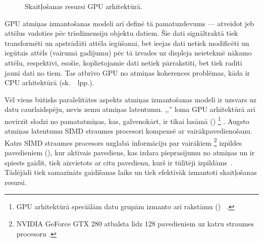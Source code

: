 \begin{figure}[tbh]
	\centering
	\def\svgscale{1.2}
	{}
	\caption{Skaitļošanas resursi GPU arhitektūrā.}
	\label{fig:gpu-arch}
\end{figure}

GPU atmiņas izmantošanas modeli arī definē tā pamatuzdevums --- atveidot jeb
 attēlus vadoties pēc trīsdimensiju objektu datiem.
Šie dati signāltraktā tiek transformēti un apstrādāti attēla iegūšanai,
bet ieejas dati  netiek modificēti
un iegūtais attēls (vairumā gadījumu) pēc tā izvades uz displeja neietekmē
nākamo attēlu, respektīvi, esošie, koplietojamie dati netiek pārrakstīti,
bet tiek radīti jauni dati no tiem. Tas atbrīvo GPU no atmiņas koherences
problēmas, kāda ir CPU arhitektūrā (sk.~\pageref{sec:cache}~lpp.).

Vēl viens būtisks paralelitātes aspekts atmiņas izmantošanas modelī ir
uzsvars uz datu caurlaidspēju, nevis zemu atmiņas latentumu.
,,'' loma GPU arhitektūrā arī novirzīt slodzi no
pamatatmiņas, kas, galvenokārt, ir tikai lasāmā
() %
\footnote{GPU arhitektūrā speciālām datu grupām izmanto arī
	rakstāmu () ~\cite{Owens-GPU}.}
\cite{Fatahalian}. Augsto atmiņas latentumu SIMD straumes procesori kompensē
ar vairākpavedienošanu. Katrs SIMD straumes procesors uzglabā informāciju
par vairākiem%
\footnote{NVIDIA GeForce GTX 280 atbalsta līdz 128 pavedieniem uz katru
	straumes procesoru \cite{Fatahalian}.}
izpildes pavedieniem (), kur aktīvais pavediens, kas izdara
pieprasījumu no atmiņas un ir spiests gaidīt, tiek aizvietots ar
citu pavedienu, kurš ir tūlītēji izpildāms~\cite{Fatahalian}. Tādējādi tiek samazināts
gaidīšanas laiks un tiek efektīvāk izmantoti skaitļošanas resursi.


